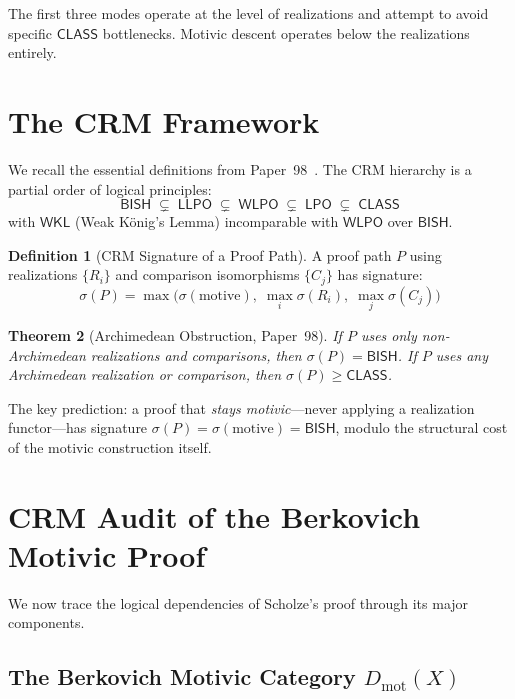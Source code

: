 \documentclass[11pt,a4paper]{article}
\theoremstyle{plain}
\newtheorem{theorem}{Theorem}[section]
\theoremstyle{definition}
\newtheorem{definition}[theorem]{Definition}
\newcommand{\BISH}{\textsf{BISH}}
\newcommand{\WKL}{\textsf{WKL}}
\newcommand{\WLPO}{\textsf{WLPO}}
\newcommand{\LLPO}{\textsf{LLPO}}
\newcommand{\LPO}{\textsf{LPO}}
\newcommand{\CLASS}{\textsf{CLASS}}
\newcommand{\Dmot}{D_{\mathrm{mot}}}
\newcommand{\sig}{\sigma}
\begin{document}
The first three modes operate at the level of realizations and attempt to avoid specific $\CLASS$ bottlenecks. Motivic descent operates below the realizations entirely.


\section{The CRM Framework}\label{sec:crm}

We recall the essential definitions from Paper~98~\cite{lee-p98}. The CRM hierarchy is a partial order of logical principles:
\[
\BISH \;\subsetneq\; \LLPO \;\subsetneq\; \WLPO \;\subsetneq\; \LPO \;\subsetneq\; \CLASS
\]
with $\WKL$ (Weak K\"onig's Lemma) incomparable with $\WLPO$ over $\BISH$.

\begin{definition}[CRM Signature of a Proof Path]
A proof path $P$ using realizations $\{R_i\}$ and comparison isomorphisms $\{C_j\}$ has signature:
\[
\sig(P) = \max\bigl(\sig(\text{motive}),\; \max_i \sig(R_i),\; \max_j \sig(C_j)\bigr)
\]
\end{definition}

\begin{theorem}[Archimedean Obstruction, Paper~98]\label{thm:archimedean}
If $P$ uses only non-Archimedean realizations and comparisons, then $\sig(P) = \BISH$. If $P$ uses any Archimedean realization or comparison, then $\sig(P) \geq \CLASS$.
\end{theorem}

The key prediction: a proof that \emph{stays motivic}---never applying a realization functor---has signature $\sig(P) = \sig(\text{motive}) = \BISH$, modulo the structural cost of the motivic construction itself.


\section{CRM Audit of the Berkovich Motivic Proof}\label{sec:audit}

We now trace the logical dependencies of Scholze's proof through its major components.

\subsection{The Berkovich Motivic Category $\Dmot(X)$}
\end{document}
